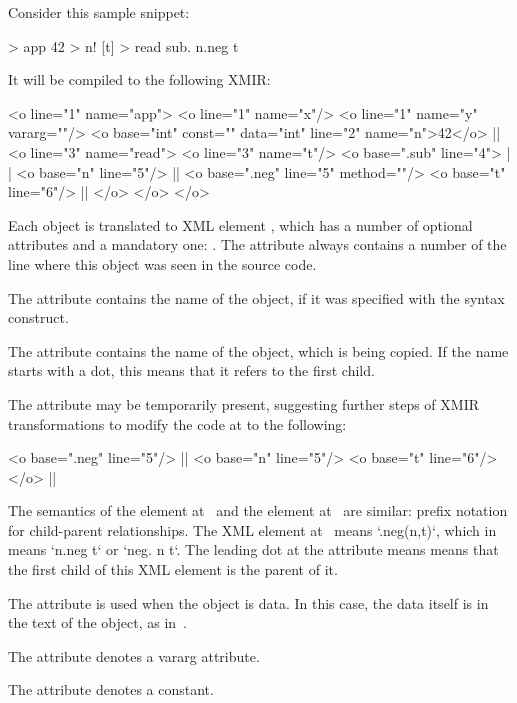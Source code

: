 Consider this sample \eo{} snippet:

\begin{ffcode}
[x y...] > app
  42 > n!
  [t] > read
    sub.
      n.neg
      t
\end{ffcode}

It will be compiled to the following XMIR:

\begin{ffcode}
<o line="1" name="app">
  <o line="1" name="x"/>
  <o line="1" name="y" vararg=""/>
  <o base="int" const="" data="int"
    line="2" name="n">42</o>   |$\label{ln:xml-data}$|
  <o line="3" name="read">
    <o line="3" name="t"/>
    <o base=".sub" line="4"> |$\label{ln:xml-sub}$|
      <o base="n" line="5"/> |$\label{ln:method-start}$|
      <o base=".neg" line="5" method=""/>
      <o base="t" line="6"/> |$\label{ln:method-end}$|
    </o>
  </o>
</o>
\end{ffcode}

Each object is translated to XML element , which has
a number of optional attributes and a mandatory one: .
The attribute  always contains a number of the
line where this object was seen in the source code.

The attribute  contains the name of the object, if
it was specified with the \ff{>} syntax construct.

The attribute  contains the name of the object, which
is being copied. If the name starts with a dot, this means
that it refers to the first  child.

The attribute  may be temporarily present, suggesting
further steps of XMIR transformations to modify the code
at  to the following:

\begin{ffcode}
<o base=".neg" line="5"/> |$\label{ln:xml-neg}$|
  <o base="n" line="5"/>
  <o base="t" line="6"/>
</o>  |$\label{ln:xml-neg-end}$|
\end{ffcode}

The semantics of the element  at~
and the element  at~ are similar: prefix
notation for child-parent relationships. The XML element at~
means `.neg(n,t)`, which in~\eo{} means `n.neg t` or `neg. n t`. The
leading dot at the attribute  means means that the first
child of this XML element is the \eo{} parent of it.

The attribute  is used when the object is data. In this
case, the data itself is in the text of the object, as in~.

The attribute  denotes a vararg attribute.

The attribute  denotes a constant.
